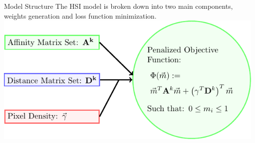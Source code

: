 \begin{frame}{Model Structure}
    The HSI model is broken down into two main components, {weights generation} and \alert{loss function minimization}. 
    \vfill
    \bc
        \includegraphics[width =\textwidth]{../Images/model_pipeline_tikz/Phase2_tikz/tikz.pdf}
    \ec
\end{frame}